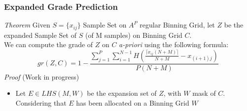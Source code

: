 \documentclass{article}
\begin{document}
\subsubsection{Expanded Grade Prediction}
\textit{Theorem}\; Given $S = \{x_{ij}\}$ Sample Set on $A^P$ regular Binning Grid, let $Z$ be the expanded Sample Set of $S$ (of M samples) on Binning Grid $C$. \\
We can compute the grade of $Z$ on $C$ \textit{a-priori} using the following formula:
\begin{equation}
gr(Z, C) = 1 - \frac{\sum^P_{j=1} \sum^{N-1}_{i=1} H(\frac{\lceil x_{ij}(N+M) \rceil}{N+M} - x_{(i+1)j})}{P(N+M)}
\end{equation}
\textit{Proof}\; (Work in progress)
\begin{itemize}[label=$\bullet$]
\item Let $E \in LHS(M, W)$ be the expansion set of $Z$, with $W$ mask of $C$. \\
Considering that $E$ has been allocated on a Binning Grid $W$ 

\end{itemize}
\end{document}
